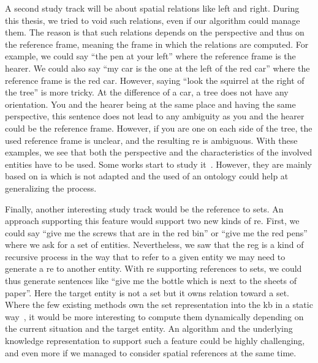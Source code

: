 A second study track will be about spatial relations like left and right. During this thesis, we tried to void such relations, even if our algorithm could manage them. The reason is that such relations depends on the perspective and thus on the reference frame, meaning the frame in which the relations are computed. For example, we could say ``the pen at your left'' where the reference frame is the hearer. We could also say ``my car is the one at the left of the red car'' where the reference frame is the red car. However, saying ``look the squirrel at the right of the tree'' is more tricky. At the difference of a car, a tree does not have any orientation. You and the hearer being at the same place and having the same perspective, this sentence does not lead to any ambiguity as you and the hearer could be the reference frame. However, if you are one on each side of the tree, the used reference frame is unclear, and the resulting \acrshort{re} is ambiguous. With these examples, we see that both the perspective and the characteristics of the involved entities have to be used. Some works start to study it~\cite{kelleher_2006_incremental, dos_2015_generating}. However, they are mainly based on \acrlong{ia} which is not adapted and the used of an ontology could help at generalizing the process.

Finally, another interesting study track would be the reference to sets. An approach supporting this feature would support two new kinds of \acrshort{re}. First, we could say ``give me the screws that are in the red bin'' or ``give me the red pens'' where we ask for a set of entities. Nevertheless, we saw that the \acrshort{reg} is a kind of recursive process in the way that to refer to a given entity we may need to generate a \acrshort{re} to another entity. With \acrshort{re} supporting references to sets, we could thus generate sentences like ``give me the bottle which is next to the sheets of paper''. Here the target entity is not a set but it owns relation toward a set. Where the few existing methods own the set representation into the \acrlong{kb} in a static way~\cite{fang_2013_towards}, it would be more interesting to compute them dynamically depending on the current situation and the target entity. An algorithm and the underlying knowledge representation to support such a feature could be highly challenging, and even more if we managed to consider spatial references at the same time.